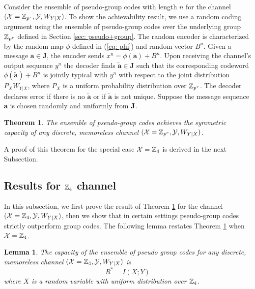 \documentclass[conference]{IEEEtran}
\theoremstyle{plain}
\newtheorem{thm}{Theorem}
\newtheorem{lem}{Lemma}
\theoremstyle{definition}
\theoremstyle{remark}
\begin{document}
 Consider the ensemble of pseudo-group codes with length $n$ for the channel $(\mathcal{X}=\mathbb{Z}_{p^r},\mathcal{Y}, W_{Y|X})$. To show the achievability result, we use a random coding argument using  the ensemble of pseudo-group codes over the underlying group $\mathbb{Z}_{p^r}$ defined in Section \ref{sec: pseudo+group}. The random encoder is characterized by the random map $\phi$ defined in (\ref{eq: phi}) and random vector $B^n$. Given a message  $\mathbf{a}\in \mathbf{J}$, the encoder sends $x^n=\phi(\mathbf{a})+B^n$. Upon receiving the channel's output sequence $y^n$ the decoder finds $\tilde{\mathbf{a}} \in \mathbf{J}$ such that its corresponding codeword $\phi(\tilde{\mathbf{a}})+B^n$ is jointly typical with $y^n$ with respect to the joint distribution $P_X W_{Y|X}$, where $P_X$ is a uniform probability distribution over $\mathbb{Z}_{p^r}$. The decoder declares error if there is no $\tilde{\mathbf{a}}$ or if $\tilde{\mathbf{a}}$ is not unique. Suppose the message sequence $\mathbf{a}$ is chosen randomly and uniformly from $\bf J$.


\begin{thm}\label{thm: pseudo_channel}
The ensemble of pseudo-group codes achieves the symmetric capacity of any discrete, memoreless channel $(\mathcal{X}=\mathbb{Z}_{p^r},\mathcal{Y}, W_{Y|X})$.
\end{thm}

A proof of this theorem for the special case $\mathcal{X}=\mathbb{Z}_4$ is derived in the next Subsection. 

\subsection{Results for $\mathbb{Z}_4$ channel}
In this subsection, we first prove the result of Theorem \ref{thm: pseudo_channel} for the channel $(\mathcal{X}=\mathbb{Z}_4,\mathcal{Y}, W_{Y|X})$, then  we show that in certain settings pseudo-group codes strictly outperform group codes. The following lemma restates Theorem \ref{thm: pseudo_channel} when $\mathcal{X}=\mathbb{Z}_4$.

\begin{lem}\label{lem: pseudo_group_for_chann_Z_4}
The capacity of the ensemble of pseudo group codes for any discrete, memoreless channel $(\mathcal{X}=\mathbb{Z}_4,\mathcal{Y}, W_{Y|X})$ is
\begin{equation*}
R^*=I(X;Y)
\end{equation*}
where $X$ is a random variable with uniform distribution over $\mathbb{Z}_4$. 
\end{lem}
\end{document}
